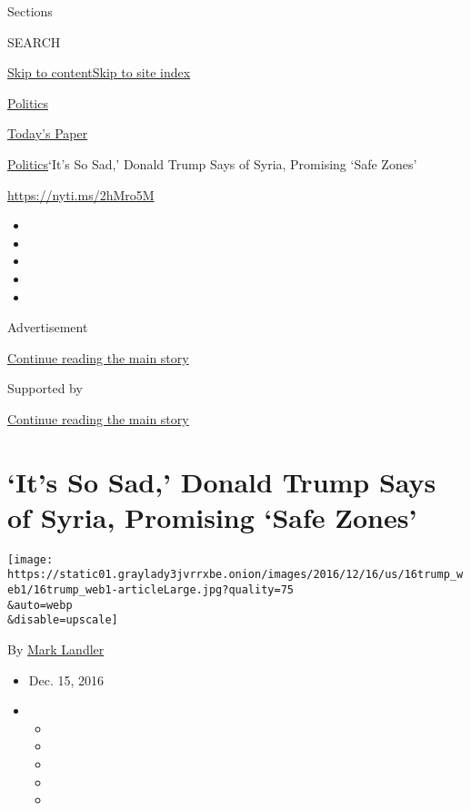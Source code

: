 Sections

SEARCH

\protect\hyperlink{site-content}{Skip to
content}\protect\hyperlink{site-index}{Skip to site index}

\href{https://www.nytimes3xbfgragh.onion/section/politics}{Politics}

\href{https://myaccount.nytimes3xbfgragh.onion/auth/login?response_type=cookie\&client_id=vi}{}

\href{https://www.nytimes3xbfgragh.onion/section/todayspaper}{Today's
Paper}

\href{/section/politics}{Politics}\textbar{}`It's So Sad,' Donald Trump
Says of Syria, Promising `Safe Zones'

\url{https://nyti.ms/2hMro5M}

\begin{itemize}
\item
\item
\item
\item
\item
\end{itemize}

Advertisement

\protect\hyperlink{after-top}{Continue reading the main story}

Supported by

\protect\hyperlink{after-sponsor}{Continue reading the main story}

\hypertarget{its-so-sad-donald-trump-says-of-syria-promising-safe-zones}{%
\section{`It's So Sad,' Donald Trump Says of Syria, Promising `Safe
Zones'}\label{its-so-sad-donald-trump-says-of-syria-promising-safe-zones}}

\texttt{[image: https://static01.graylady3jvrrxbe.onion/images/2016/12/16/us/16trump\_web1/16trump\_web1-articleLarge.jpg?quality=75\\\&auto=webp\\\&disable=upscale]}

By \href{http://www.nytimes3xbfgragh.onion/by/mark-landler}{Mark
Landler}

\begin{itemize}
\item
  Dec. 15, 2016
\item
  \begin{itemize}
  \item
  \item
  \item
  \item
  \item
  \end{itemize}
\end{itemize}


